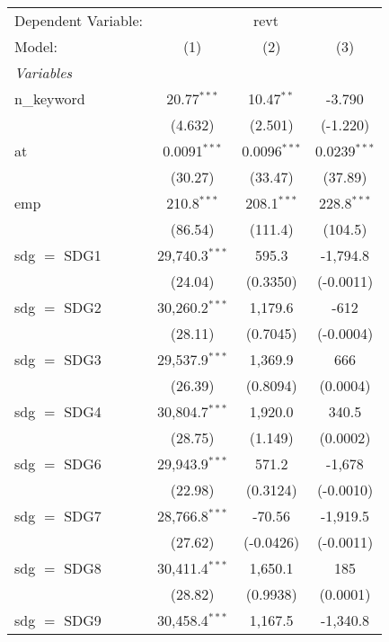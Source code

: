 
\begingroup
\centering
\begin{tabular}{lccc}
   \tabularnewline \midrule \midrule
   Dependent Variable: & \multicolumn{3}{c}{revt}\\
   Model:        & (1)              & (2)            & (3)\\  
   \midrule
   \emph{Variables}\\
   n\_keyword    & 20.77$^{***}$    & 10.47$^{**}$   & -3.790\\   
                 & (4.632)          & (2.501)        & (-1.220)\\   
   at            & 0.0091$^{***}$   & 0.0096$^{***}$ & 0.0239$^{***}$\\   
                 & (30.27)          & (33.47)        & (37.89)\\   
   emp           & 210.8$^{***}$    & 208.1$^{***}$  & 228.8$^{***}$\\   
                 & (86.54)          & (111.4)        & (104.5)\\   
   sdg $=$ SDG1  & 29,740.3$^{***}$ & 595.3          & -1,794.8\\   
                 & (24.04)          & (0.3350)       & (-0.0011)\\   
   sdg $=$ SDG2  & 30,260.2$^{***}$ & 1,179.6        & -612\\   
                 & (28.11)          & (0.7045)       & (-0.0004)\\   
   sdg $=$ SDG3  & 29,537.9$^{***}$ & 1,369.9        & 666\\   
                 & (26.39)          & (0.8094)       & (0.0004)\\   
   sdg $=$ SDG4  & 30,804.7$^{***}$ & 1,920.0        & 340.5\\   
                 & (28.75)          & (1.149)        & (0.0002)\\   
   sdg $=$ SDG6  & 29,943.9$^{***}$ & 571.2          & -1,678\\   
                 & (22.98)          & (0.3124)       & (-0.0010)\\   
   sdg $=$ SDG7  & 28,766.8$^{***}$ & -70.56         & -1,919.5\\   
                 & (27.62)          & (-0.0426)      & (-0.0011)\\   
   sdg $=$ SDG8  & 30,411.4$^{***}$ & 1,650.1        & 185\\   
                 & (28.82)          & (0.9938)       & (0.0001)\\   
   sdg $=$ SDG9  & 30,458.4$^{***}$ & 1,167.5        & -1,340.8\\   

\end{tabular}
